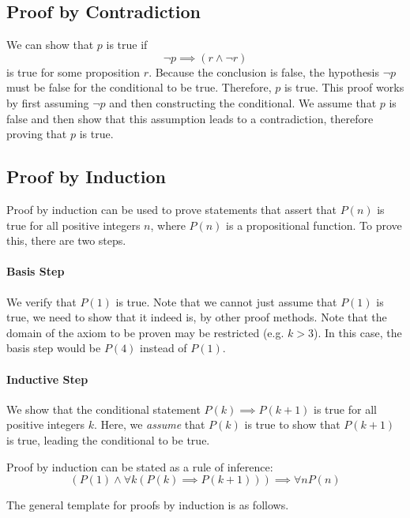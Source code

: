 \subsection{Proof by Contradiction}\label{sub:proof_by_contradiction}
We can show that \( p \) is true if \[
	\neg p \implies (r \wedge \neg r)	
\] 
is true for some proposition \( r \). Because the conclusion is false, the hypothesis \( \neg p \) must be false for the conditional to be true. Therefore, \( p \) is true. This proof works by first assuming \( \neg p \) and then constructing the conditional. We assume that \( p \) is false and then show that this assumption leads to a contradiction, therefore proving that \( p \) is true.

\subsection{Proof by Induction}
Proof by induction can be used to prove statements that assert that \( P(n) \) is true for all positive integers \( n \), where \( P(n) \) is a propositional function. To prove this, there are two steps.

\paragraph{Basis Step} We verify that \( P(1) \) is true. Note that we cannot just assume that \( P(1) \) is true, we need to show that it indeed is, by other proof methods. Note that the domain of the axiom to be proven may be restricted (e.g. \( k > 3 \)). In this case, the basis step would be \( P(4) \) instead of \( P(1) \).  

\paragraph{Inductive Step} We show that the conditional statement \( P(k) \implies P(k+1) \) is true for all positive integers \( k \). Here, we \emph{assume} that \( P(k) \) is true to show that \( P(k+1) \) is true, leading the conditional to be true.

Proof by induction can be stated as a rule of inference: \[
( P(1) \wedge \forall k(P(k) \implies P(k+1))) \implies \forall nP(n)
\]

The general template for proofs by induction is as follows.


